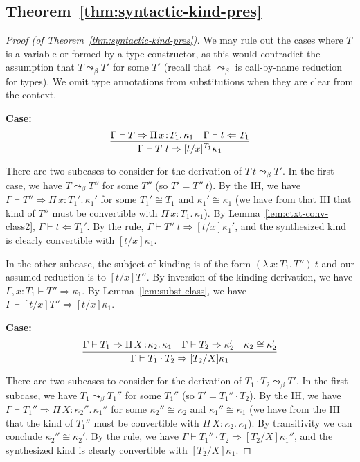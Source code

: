 \documentclass{article}
\newcommand{\abs}[4]{{#1}\, #2\! : \! #3.\, #4}
\newcommand{\tpcheck}[0]{\Leftarrow}
\newcommand{\tpsynth}[0]{\Rightarrow}
\newcommand{\startcase}[1]{\vspace{#1} \noindent\textbf{\underline{Case:}}}
\begin{document}
\subsection{Theorem~\ref{thm:syntactic-kind-pres}}
\begin{proof}[Proof (of Theorem~\ref{thm:syntactic-kind-pres})]
  We may rule out the cases where \(T\) is a variable or formed by a type
  constructor, as this would contradict the assumption that \(T \leadsto_{\beta}
  T'\) for some \(T'\) (recall that \(\leadsto_\beta\) is call-by-name reduction
  for types).
  We omit type annotations from substitutions when they are clear from the context.

  \startcase{.2cm}
  \[
    \infer{\Gamma\vdash T\ t \tpsynth [t/x]^{T_1}\kappa_1}{\Gamma\vdash T \tpsynth
      \abs{\Pi}{x}{T_1}{\kappa_1} & \Gamma\vdash t \tpcheck T_1}
  \]

  There are two subcases to consider for the derivation of \(T\ t \leadsto_\beta
  T'\). In the first case, we have \(T \leadsto_\beta T''\) for some \(T''\) (so
  \(T' = T''\ t\)). By the IH, we have \(\Gamma \vdash T'' \tpsynth
  \abs{\Pi}{x}{T_1'}{\kappa_1'}\) for some \(T_1' \cong T_1\) and \(\kappa_1'
  \cong \kappa_1\) (we have from that IH that kind of \(T''\) must be
  convertible with \(\abs{\Pi}{x}{T_1}{\kappa_1}\)). By
  Lemma~\ref{lem:ctxt-conv-class2}, \(\Gamma \vdash t \tpcheck T_1'\).
  By the rule, \(\Gamma \vdash T''\ t \tpsynth [t/x]\kappa_1'\), and the
  synthesized kind is clearly convertible with \([t/x]\kappa_1\).

  In the other subcase, the subject of kinding is of the form
  \((\abs{\lambda}{x}{T_1}{T''})\ t\) and our assumed reduction is to
  \([t/x]T''\). By inversion of the kinding derivation, we have \(\Gamma,x:T_1
  \vdash T'' \tpsynth \kappa_1\). By Lemma~\ref{lem:subst-class}, we have
  \(\Gamma \vdash [t/x]T'' \tpsynth [t/x]\kappa_1\).

  \startcase{.2cm}
  \[
    \infer{\Gamma\vdash T_1 \cdot T_2 \tpsynth [T_2/X]\kappa_1}{\Gamma\vdash T_1
      \tpsynth \abs{\Pi}{X}{\kappa_2}{\kappa_1} & \Gamma\vdash T_2 \tpsynth
      \kappa_2' & \kappa_2 \cong \kappa_2'}
  \]

  There are two subcases to consider for the derivation of \(T_1 \cdot T_2
  \leadsto_\beta T'\). In the first subcase, we have \(T_1 \leadsto_\beta
  T_1''\) for some \(T_1''\) (so \(T' = T_1'' \cdot T_2\)). By the IH, we have
  \(\Gamma \vdash T_1'' \tpsynth \abs{\Pi}{X}{\kappa_2''}{\kappa_1''}\) for some
  \(\kappa_2'' \cong \kappa_2\) and \(\kappa_1'' \cong \kappa_1\) (we have from
  the IH that the kind of \(T_1''\) must be convertible with
  \(\abs{\Pi}{X}{\kappa_2}{\kappa_1}\)).
  By transitivity we can conclude \(\kappa_2'' \cong \kappa_2'\).
  By the rule, we have \(\Gamma \vdash T_1'' \cdot T_2 \tpsynth
  [T_2/X]\kappa_1''\), and the synthesized kind is clearly convertible with
  \([T_2/X]\kappa_1\).


\end{proof}
\end{document}
